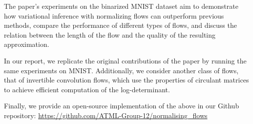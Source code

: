 
The paper’s experiments on the binarized MNIST dataset aim to demonstrate how variational inference with normalizing flows can outperform previous methods, compare the performance of different types of flows, and discuss the relation between the length of the flow and the quality of the resulting approximation.

In our report, we replicate the original contributions of the paper by running the same experiments on MNIST. Additionally, we consider another class of flows, that of invertible convolution flows, which use the properties of circulant matrices to achieve efficient computation of the log-determinant. 

Finally, we provide an open-source implementation of the above in our Github repository: 
\url{https://github.com/ATML-Group-12/normalising_flows}

